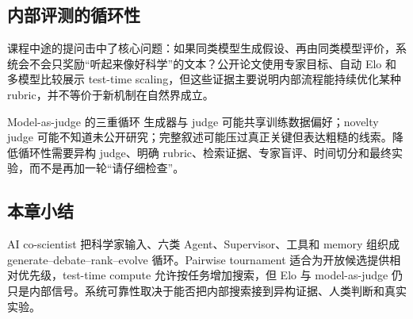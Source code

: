
\subsection{内部评测的循环性}

课程中途的提问击中了核心问题：如果同类模型生成假设、再由同类模型评价，系统会不会只奖励“听起来像好科学”的文本？公开论文使用专家目标、自动 Elo 和多模型比较展示 test-time scaling，但这些证据主要说明内部流程能持续优化某种 rubric，并不等价于新机制在自然界成立。

\begin{warningbox}{Model-as-judge 的三重循环}
生成器与 judge 可能共享训练数据偏好；novelty judge 可能不知道未公开研究；完整叙述可能压过真正关键但表达粗糙的线索。降低循环性需要异构 judge、明确 rubric、检索证据、专家盲评、时间切分和最终实验，而不是再加一轮“请仔细检查”。
\end{warningbox}


\subsection{本章小结}

AI co-scientist 把科学家输入、六类 Agent、Supervisor、工具和 memory 组织成 generate--debate--rank--evolve 循环。Pairwise tournament 适合为开放候选提供相对优先级，test-time compute 允许按任务增加搜索，但 Elo 与 model-as-judge 仍只是内部信号。系统可靠性取决于能否把内部搜索接到异构证据、人类判断和真实实验。

